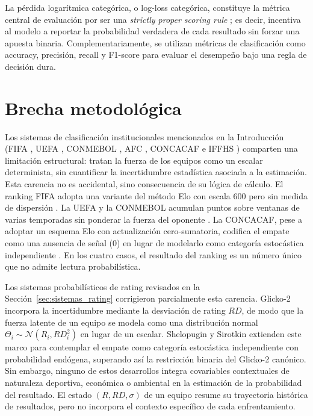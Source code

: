 La p\'erdida logar\'itmica categ\'orica, o log-loss categ\'orica, constituye la m\'etrica central de evaluaci\'on por ser una \emph{strictly proper scoring rule} \cite{gneiting2007}; es decir, incentiva al modelo a reportar la probabilidad verdadera de cada resultado sin forzar una apuesta binaria. Complementariamente, se utilizan m\'etricas de clasificaci\'on como accuracy, precisi\'on, recall y F1-score para evaluar el desempe\~no bajo una regla de decisi\'on dura.

\section{Brecha metodol\'ogica}
\label{sec:brecha}

Los sistemas de clasificaci\'on institucionales mencionados en la  Introducci\'on (FIFA \cite{FIFARanking2024}, UEFA \cite{UEFARanking2024}, CONMEBOL \cite{CONMEBOLRanking2021}, AFC 
\cite{AFCRanking2024}, CONCACAF \cite{CONCACAFRanking2023} e IFFHS  \cite{IFFHSRanking2021}) comparten una limitaci\'on estructural: tratan la fuerza de los equipos como un escalar determinista, sin 
cuantificar la incertidumbre estad\'istica asociada a la estimaci\'on. Esta carencia no es accidental, sino consecuencia de su l\'ogica de c\'alculo. El ranking FIFA adopta una variante del m\'etodo Elo con escala $600$ pero sin medida de dispersi\'on \cite{FIFARanking2024}. La UEFA y la CONMEBOL acumulan puntos sobre ventanas de varias 
temporadas sin ponderar la fuerza del oponente 
\cite{UEFARanking2024,CONMEBOLRanking2021}. La CONCACAF, pese a adoptar un esquema Elo con actualizaci\'on cero-sumatoria, codifica 
el empate como una ausencia de se\~nal ($0$) en lugar de modelarlo como categor\'ia estoc\'astica independiente \cite{CONCACAFRanking2023}. En los cuatro casos, el resultado del ranking es un n\'umero \'unico que no admite lectura probabil\'istica.

Los sistemas probabil\'isticos de rating revisados en la 
Secci\'on~\ref{sec:sistemas_rating} corrigieron parcialmente esta 
carencia. Glicko-2 \cite{Glickman2022} incorpora la incertidumbre 
mediante la desviaci\'on de rating $RD$, de modo que la fuerza 
latente de un equipo se modela como una distribuci\'on normal 
$\Theta_i \sim \mathcal{N}(R_i, RD_i^2)$ en lugar de un escalar. 
Shelopugin y Sirotkin \cite{Glicko2Mod} extienden este marco para 
contemplar el empate como categor\'ia estoc\'astica independiente 
con probabilidad end\'ogena, superando as\'i la restricci\'on 
binaria del Glicko-2 can\'onico. Sin embargo, ninguno de estos 
desarrollos integra covariables contextuales de naturaleza 
deportiva, econ\'omica o ambiental en la estimaci\'on de la 
probabilidad del resultado. El estado $(R, RD, \sigma)$ de un 
equipo resume su trayectoria hist\'orica de resultados, pero no 
incorpora el contexto espec\'ifico de cada enfrentamiento.

